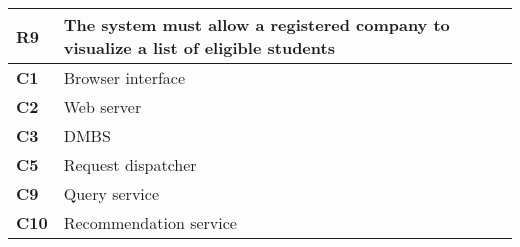 \begin{table}[H]
    \centering
    \begin{tabular}{|l|m{10cm}|}
        \hline \textbf{R9} & The system must allow a registered company to visualize a list of eligible students \\
        \hline \textbf{C1} & Browser interface \\
        \hline \textbf{C2} & Web server \\
        \hline \textbf{C3} & DMBS \\
        \hline \textbf{C5} & Request dispatcher \\
        \hline \textbf{C9} & Query service \\
        \hline \textbf{C10} & Recommendation service \\
        \hline
    \end{tabular}
\end{table}

